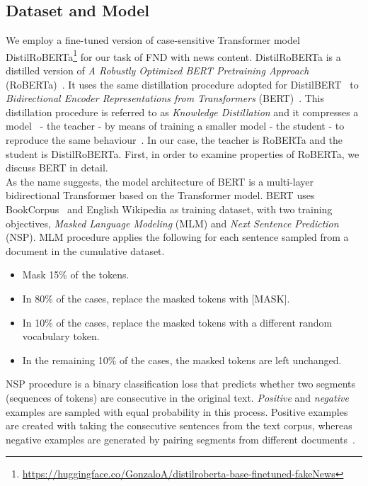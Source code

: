\subsection{Dataset and Model}
\label{subsec:newContentModel_DatasetAndModel}
We employ a fine-tuned version of case-sensitive Transformer model DistilRoBERTa\footnote{\url{https://huggingface.co/GonzaloA/distilroberta-base-finetuned-fakeNews}} for our task of FND with news content. DistilRoBERTa is a distilled version of \emph{A Robustly Optimized BERT Pretraining Approach} (RoBERTa)~\parencite{RoBERTa_Liu}. It uses the same distillation procedure adopted for  DistilBERT~\parencite{DistilBERT_Sanh} to \emph{Bidirectional Encoder Representations from Transformers} (BERT)~\parencite{BERT_Devlin}. This distillation procedure is referred to as \emph{Knowledge Distillation} and it compresses a model~\parencite{ModelCompression_Bucilua} - the teacher - by means of training a smaller model - the student - to reproduce the same behaviour~\parencite{DistillingTheKnowledge_Hinton}. In our case, the teacher is  RoBERTa and the student is DistilRoBERTa. First, in order to examine properties of RoBERTa, we discuss BERT in detail.\\
As the name suggests, the model architecture of BERT is a multi-layer bidirectional Transformer based on the Transformer model. BERT uses BookCorpus~\parencite{BookCorpus_Yukun} and English Wikipedia as training dataset, with two training objectives, \emph{Masked Language Modeling} (MLM) and \emph{Next Sentence Prediction} (NSP). MLM procedure applies the following for each sentence sampled from a document in the cumulative dataset.
\begin{itemize}
    \item Mask 15\% of the tokens.
    \item In 80\% of the cases, replace the masked tokens with [MASK].
    \item In 10\% of the cases, replace the masked tokens with a different random vocabulary token.
    \item In the remaining 10\% of the cases, the masked tokens are left unchanged.
\end{itemize}
NSP procedure is a binary classification loss that predicts whether two segments (sequences of tokens) are consecutive in
the original text. \emph{Positive} and \emph{negative} examples are sampled with equal probability in this process.
Positive examples are created with taking the consecutive sentences from the text corpus, whereas negative examples
are generated by pairing segments from different documents~\parencite{RoBERTa_Liu}.\\
